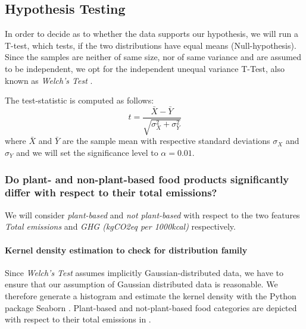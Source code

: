\documentclass{article}
\begin{document}
\subsection*{Hypothesis Testing}
In order  to decide as to whether the data supports our hypothesis, we will run a T-test, which tests, if the two distributions have equal means (Null-hypothesis).  Since the samples are neither of same size, nor of same variance and are assumed to be independent, we opt for the independent unequal variance T-Test, also known as \textit{Welch's Test} \cite{Welch1947}. 



The test-statistic is computed as follows:
\begin{equation}\label{eq:t-test}
  t = \frac{\bar{X}-\bar{Y}}{\sqrt{\sigma^2_{X}+\sigma^2_{Y}}}
\end{equation}
where $\bar{X}$ and  $\bar{Y}$ are the sample mean with respective standard deviations $\sigma_{X}$ and $\sigma_{Y}$ and we will set the significance level to $\alpha = 0.01$.

\subsubsection*{Do plant- and non-plant-based food products significantly differ with respect to their total emissions?}


 We will consider \textit{plant-based} and \textit{not plant-based} with respect to  the two features \textit{Total emissions} and \textit{GHG (kgCO2eq per 1000kcal)} respectively.
\paragraph*{Kernel density estimation to check for distribution family} Since \textit{Welch's Test} assumes implicitly Gaussian-distributed data, we have to ensure that our assumption of Gaussian distributed data is reasonable.  We therefore generate a histogram and estimate the kernel density with the Python package Seaborn \cite{Seaborn}. Plant-based and not-plant-based food categories are depicted with respect to their total emissions in .
\end{document}
